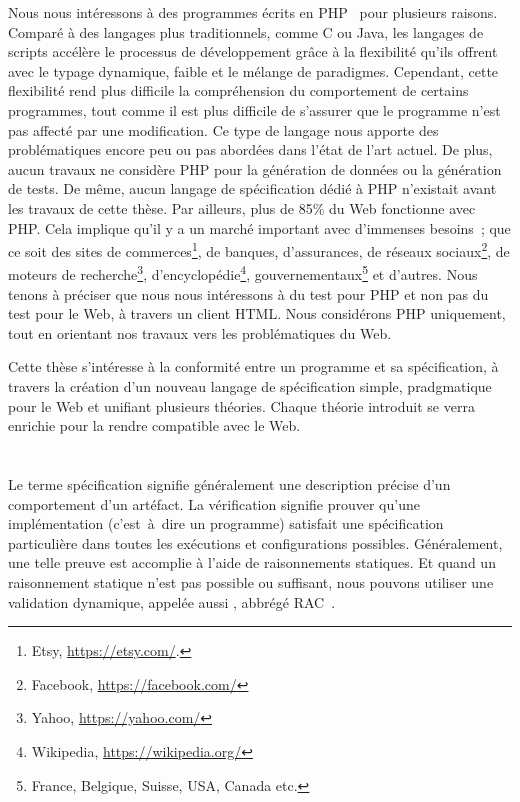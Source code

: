 Nous nous intéressons à des programmes écrits en PHP~ pour plusieurs
raisons. Comparé à des langages plus traditionnels, comme C ou Java, les
langages de scripts accélère le processus de développement grâce à la
flexibilité qu'ils offrent avec le typage dynamique, faible et le mélange de
paradigmes. Cependant, cette flexibilité rend plus difficile la compréhension du
comportement de certains programmes, tout comme il est plus difficile de
s'assurer que le programme n'est pas affecté par une modification. Ce type de
langage nous apporte des problématiques encore peu ou pas abordées dans l'état
de l'art actuel. De plus, aucun travaux ne considère PHP pour la génération de
données ou la génération de tests. De même, aucun langage de spécification dédié
à PHP n'existait avant les travaux de cette thèse. Par ailleurs, plus de 85\% du
Web fonctionne avec PHP. Cela implique qu'il y a un marché important avec
d'immenses besoins~; que ce soit des sites de commerces\footnote{Etsy,
\url{https://etsy.com/}.}, de banques, d'assurances, de réseaux
sociaux\footnote{Facebook, \url{https://facebook.com/}}, de moteurs de
recherche\footnote{Yahoo, \url{https://yahoo.com/}},
d'encyclopédie\footnote{Wikipedia, \url{https://wikipedia.org/}},
gouvernementaux\footnote{France, Belgique, Suisse, USA, Canada etc.} et
d'autres. Nous tenons à préciser que nous nous intéressons à du test pour PHP et
non pas du test pour le Web, à travers un client HTML. Nous considérons PHP
uniquement, tout en orientant nos travaux vers les problématiques du Web.

Cette thèse s'intéresse à la conformité entre un programme et sa spécification,
à travers la création d'un nouveau langage de spécification simple, pradgmatique
pour le Web et unifiant plusieurs théories. Chaque théorie introduit se verra
enrichie pour la rendre compatible avec le Web.

\section{}
\label{section:sota:bisl}

Le terme {\strong spécification} signifie généralement une description précise
d'un comportement d'un artéfact. La {\strong vérification} signifie prouver
qu'une implémentation (c'est~à~dire un programme) satisfait une spécification
particulière dans toutes les exécutions et configurations possibles.
Généralement, une telle preuve est accomplie à l'aide de raisonnements
statiques. Et quand un raisonnement statique n'est pas possible ou suffisant,
nous pouvons utiliser une {\strong validation} dynamique, appelée aussi
, abbrégé RAC~.

